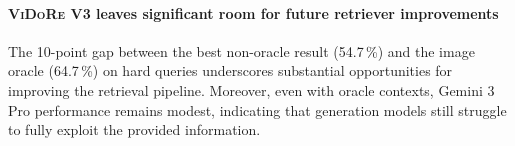 
\paragraph{\textsc{ViDoRe} V3 leaves significant room for future retriever improvements} The 10-point gap between the best non-oracle result (54.7\,\%) and the image oracle (64.7\,\%) on hard queries underscores substantial opportunities for improving the retrieval pipeline. Moreover, even with oracle contexts, Gemini 3 Pro performance remains modest, indicating that generation models still struggle to fully exploit the provided information.



